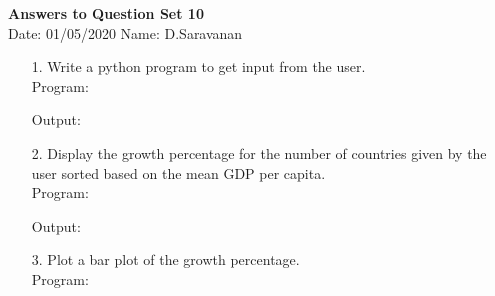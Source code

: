 \documentclass[a4paper,11pt,openright]{report}
\begin{document}
\singlespacing
\pagestyle{plain}

\begin{center}
\textbf{Answers to Question Set 10} \\
Date: 01/05/2020 \hspace{2mm} Name: D.Saravanan
\end{center}

\vspace{10px}

\begin{enumerate}

\item[1.] Write a python program to get input from the user. \\

Program:


\vspace{5px}

Output:


\vspace{10px}

\pagebreak

\item[2.] Display the growth percentage for the number of countries given by the user
sorted based on the mean GDP per capita. \\

Program:


\vspace{5px}

\pagebreak

Output:


\vspace{10px}

\pagebreak

\item[3.] Plot a bar plot of the growth percentage. \\

Program: 


\vspace{5px}

\pagebreak


\end{enumerate}
\end{document}
